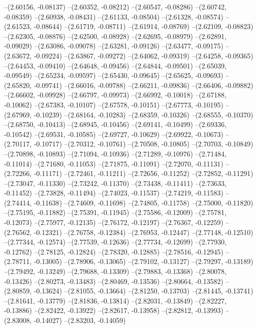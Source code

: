 --(2.60156, -0.08137)
--(2.60352, -0.08212)
--(2.60547, -0.08286)
--(2.60742, -0.08359)
--(2.60938, -0.08431)
--(2.61133, -0.08504)
--(2.61328, -0.08574)
--(2.61523, -0.08644)
--(2.61719, -0.08711)
--(2.61914, -0.08769)
--(2.62109, -0.08823)
--(2.62305, -0.08876)
--(2.62500, -0.08928)
--(2.62695, -0.08979)
--(2.62891, -0.09029)
--(2.63086, -0.09078)
--(2.63281, -0.09126)
--(2.63477, -0.09175)
--(2.63672, -0.09224)
--(2.63867, -0.09272)
--(2.64062, -0.09319)
--(2.64258, -0.09365)
--(2.64453, -0.09410)
--(2.64648, -0.09456)
--(2.64844, -0.09501)
--(2.65039, -0.09549)
--(2.65234, -0.09597)
--(2.65430, -0.09645)
--(2.65625, -0.09693)
--(2.65820, -0.09741)
--(2.66016, -0.09788)
--(2.66211, -0.09836)
--(2.66406, -0.09882)
--(2.66602, -0.09928)
--(2.66797, -0.09973)
--(2.66992, -0.10018)
--(2.67188, -0.10062)
--(2.67383, -0.10107)
--(2.67578, -0.10151)
--(2.67773, -0.10195)
--(2.67969, -0.10239)
--(2.68164, -0.10283)
--(2.68359, -0.10326)
--(2.68555, -0.10370)
--(2.68750, -0.10413)
--(2.68945, -0.10456)
--(2.69141, -0.10499)
--(2.69336, -0.10542)
--(2.69531, -0.10585)
--(2.69727, -0.10629)
--(2.69922, -0.10673)
--(2.70117, -0.10717)
--(2.70312, -0.10761)
--(2.70508, -0.10805)
--(2.70703, -0.10849)
--(2.70898, -0.10893)
--(2.71094, -0.10936)
--(2.71289, -0.10976)
--(2.71484, -0.11014)
--(2.71680, -0.11053)
--(2.71875, -0.11091)
--(2.72070, -0.11131)
--(2.72266, -0.11171)
--(2.72461, -0.11211)
--(2.72656, -0.11252)
--(2.72852, -0.11291)
--(2.73047, -0.11330)
--(2.73242, -0.11370)
--(2.73438, -0.11411)
--(2.73633, -0.11452)
--(2.73828, -0.11494)
--(2.74023, -0.11537)
--(2.74219, -0.11583)
--(2.74414, -0.11638)
--(2.74609, -0.11698)
--(2.74805, -0.11758)
--(2.75000, -0.11820)
--(2.75195, -0.11882)
--(2.75391, -0.11945)
--(2.75586, -0.12009)
--(2.75781, -0.12073)
--(2.75977, -0.12135)
--(2.76172, -0.12197)
--(2.76367, -0.12259)
--(2.76562, -0.12321)
--(2.76758, -0.12384)
--(2.76953, -0.12447)
--(2.77148, -0.12510)
--(2.77344, -0.12574)
--(2.77539, -0.12636)
--(2.77734, -0.12699)
--(2.77930, -0.12762)
--(2.78125, -0.12824)
--(2.78320, -0.12885)
--(2.78516, -0.12945)
--(2.78711, -0.13005)
--(2.78906, -0.13065)
--(2.79102, -0.13127)
--(2.79297, -0.13189)
--(2.79492, -0.13249)
--(2.79688, -0.13309)
--(2.79883, -0.13368)
--(2.80078, -0.13426)
--(2.80273, -0.13483)
--(2.80469, -0.13536)
--(2.80664, -0.13582)
--(2.80859, -0.13624)
--(2.81055, -0.13664)
--(2.81250, -0.13703)
--(2.81445, -0.13741)
--(2.81641, -0.13779)
--(2.81836, -0.13814)
--(2.82031, -0.13849)
--(2.82227, -0.13886)
--(2.82422, -0.13922)
--(2.82617, -0.13958)
--(2.82812, -0.13993)
--(2.83008, -0.14027)
--(2.83203, -0.14059)
